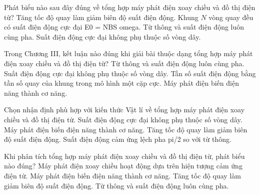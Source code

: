\begin{ex}
Phát biểu nào sau đây đúng về tổng hợp máy phát điện xoay chiều và đồ thị điện từ?
\choice
{Tăng tốc độ quay làm giảm biên độ suất điện động.}
{\True Khung $N$ vòng quay đều có suất điện động cực đại E0 = NBS omega.}
{Từ thông và suất điện động luôn cùng pha.}
{Suất điện động cực đại không phụ thuộc số vòng dây.}
\end{ex}

\begin{ex}
Trong Chương III, kết luận nào đúng khi giải bài thuộc dạng tổng hợp máy phát điện xoay chiều và đồ thị điện từ?
\choice
{Từ thông và suất điện động luôn cùng pha.}
{Suất điện động cực đại không phụ thuộc số vòng dây.}
{\True Tần số suất điện động bằng tần số quay của khung trong mô hình một cặp cực.}
{Máy phát điện biến điện năng thành cơ năng.}
\end{ex}

\begin{ex}
Chọn nhận định phù hợp với kiến thức Vật lí về tổng hợp máy phát điện xoay chiều và đồ thị điện từ.
\choice
{Suất điện động cực đại không phụ thuộc số vòng dây.}
{Máy phát điện biến điện năng thành cơ năng.}
{Tăng tốc độ quay làm giảm biên độ suất điện động.}
{\True Suất điện động cảm ứng lệch pha pi/2 so với từ thông.}
\end{ex}

\begin{ex}
Khi phân tích tổng hợp máy phát điện xoay chiều và đồ thị điện từ, phát biểu nào đúng?
\choice
{\True Máy phát điện xoay chiều hoạt động dựa trên hiện tượng cảm ứng điện từ.}
{Máy phát điện biến điện năng thành cơ năng.}
{Tăng tốc độ quay làm giảm biên độ suất điện động.}
{Từ thông và suất điện động luôn cùng pha.}
\end{ex}
